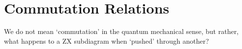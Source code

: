 \chapter{\label{commutation-relations}Commutation Relations}

We do not mean `commutation' in the quantum mechanical sense, but rather, what happens to a ZX subdiagram when `pushed' through another?

